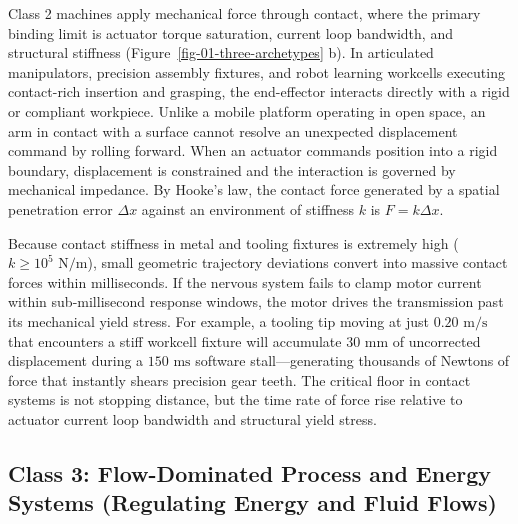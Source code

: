\documentclass[
  10pt,
  letterpaper,
  twoside,
  openright,
  numbers=noenddot,
  headings=standardclasses
]{scrbook}
\begin{document}
Class 2 machines apply mechanical force through contact, where the
primary binding limit is actuator torque saturation, current loop
bandwidth, and structural stiffness
(Figure~\ref{fig-01-three-archetypes} b). In articulated manipulators,
precision assembly fixtures, and robot learning workcells executing
contact-rich insertion and grasping, the end-effector interacts directly
with a rigid or compliant workpiece. Unlike a mobile platform operating
in open space, an arm in contact with a surface cannot resolve an
unexpected displacement command by rolling forward. When an actuator
commands position into a rigid boundary, displacement is constrained and
the interaction is governed by mechanical impedance. By Hooke's law, the
contact force generated by a spatial penetration error \(\Delta x\)
against an environment of stiffness \(k\) is
\(F = k \Delta x\).

Because contact stiffness in metal and tooling fixtures is extremely
high (\(k \ge 10^5\text{ N/m}\)), small geometric trajectory deviations
convert into massive contact forces within milliseconds. If the nervous
system fails to clamp motor current within sub-millisecond response
windows, the motor drives the transmission past its mechanical yield
stress. For example, a tooling tip moving at just \(0.20\text{ m/s}\)
that encounters a stiff workcell fixture will accumulate
\(30\text{ mm}\) of uncorrected displacement during a \(150\text{ ms}\)
software stall---generating thousands of Newtons of force that instantly
shears precision gear teeth. The critical floor in contact systems is
not stopping distance, but the time rate of force rise relative to
actuator current loop bandwidth and structural yield stress.

\subsection{Class 3: Flow-Dominated Process and Energy Systems
(Regulating Energy and Fluid
Flows)}\label{class-3-flow-dominated-process-and-energy-systems-regulating-energy-and-fluid-flows}
\end{document}
